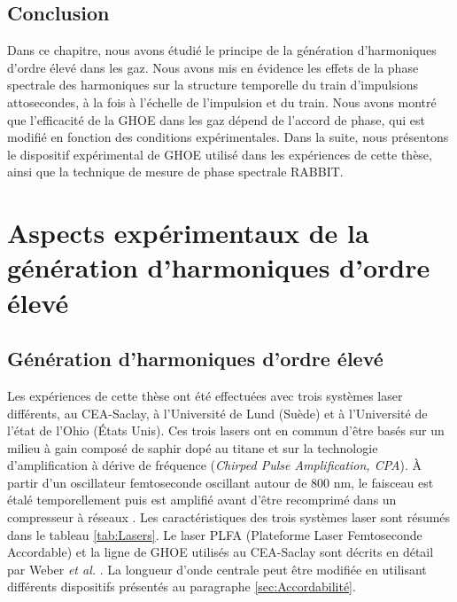 
\section*{Conclusion}
Dans ce chapitre, nous avons étudié le principe de la génération d'harmoniques d'ordre élevé dans les gaz. Nous avons mis en évidence les effets de la phase spectrale des harmoniques sur la structure temporelle du train d'impulsions attosecondes, à la fois à l'échelle de l'impulsion et du train. Nous avons montré que l'efficacité de la GHOE dans les gaz dépend de l'accord de phase, qui est modifié en fonction des conditions expérimentales. Dans la suite, nous présentons le dispositif expérimental de GHOE utilisé dans les expériences de cette thèse, ainsi que la technique de mesure de phase spectrale RABBIT.


\chapter{Aspects expérimentaux de la génération d'harmoniques d'ordre élevé}
\section{Génération d'harmoniques d'ordre élevé}
\label{sec:HHG}
Les expériences de cette thèse ont été effectuées avec trois systèmes laser différents, au CEA-Saclay, à l'Université de Lund (Suède) et à l'Université de l'état de l'Ohio (\'{E}tats Unis). Ces trois lasers ont en commun d'être basés sur un milieu à gain composé de saphir dopé au titane et sur la technologie d'amplification à dérive de fréquence (\textit{Chirped Pulse Amplification, CPA}). \`{A} partir d'un oscillateur femtoseconde oscillant autour de 800 nm, le faisceau est étalé temporellement puis est amplifié avant d'être recomprimé dans un compresseur à réseaux . Les caractéristiques des trois systèmes laser sont résumés dans le tableau \ref{tab:Lasers}. Le laser PLFA (Plateforme Laser Femtoseconde Accordable) et la ligne de GHOE utilisés au CEA-Saclay sont décrits en détail par Weber \textit{et al.} . La longueur d'onde centrale peut être modifiée en utilisant différents dispositifs présentés au paragraphe \ref{sec:Accordabilité}.

